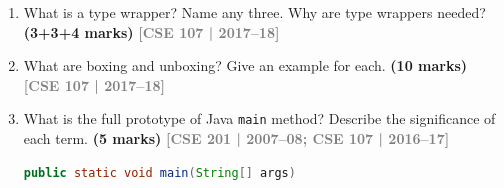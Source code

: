 \documentclass[12pt,a3paper]{article}
\newcommand{\yr}[1]{\hfill\textcolor{gray}{\small\textbf{[#1]}}}
\newcommand{\mk}[1]{\textcolor{orange!70!black}{\small\textbf{(#1 marks)}}}
\begin{document}
\begin{enumerate}
\begin{tcolorbox}[enhanced,breakable,ansbox,
  colback=cB!4,colframe=cB,boxrule=0.8pt,arc=5pt,
  title={\textbf{Answer --- Count Tokens and Print (Delimiter: Space)}},
  fonttitle=\bfseries\color{white},colbacktitle=cB]

\begin{lstlisting}[language=Java]
import java.util.Scanner;

public class TokenCounter {
    public static void main(String[] args) {
        Scanner sc = new Scanner(System.in);
        System.out.print("Enter a string: ");
        String input = sc.nextLine();
        sc.close();

        // split on one or more spaces
        String[] tokens = input.trim().split("\\s+");

        System.out.println("Number of tokens: " + tokens.length);
        System.out.println("Tokens:");
        for (String token : tokens)
            System.out.println("  " + token);
    }
}
\end{lstlisting}

\textbf{Sample run:}
\begin{lstlisting}
Enter a string: the quick brown fox
Number of tokens: 4
Tokens:
  the
  quick
  brown
  fox
\end{lstlisting}

\end{tcolorbox}

\item What is a type wrapper? Name any three. Why are type wrappers needed? \mk{3+3+4}
\yr{CSE 107 | 2017--18}

\item What are boxing and unboxing? Give an example for each. \mk{10}
\yr{CSE 107 | 2017--18}

\item What is the full prototype of Java \texttt{main} method? Describe the significance of each term. \mk{5}
\yr{CSE 201 | 2007--08; CSE 107 | 2016--17}

\begin{tcolorbox}[enhanced,breakable,ansbox,
  colback=cB!4,colframe=cB,boxrule=0.8pt,arc=5pt,
  title={\textbf{Answer --- Java \texttt{main} Method Prototype}},
  fonttitle=\bfseries\color{white},colbacktitle=cB]

\begin{lstlisting}[language=Java]
public static void main(String[] args)
\end{lstlisting}


\end{tcolorbox}
\end{enumerate}
\end{document}
